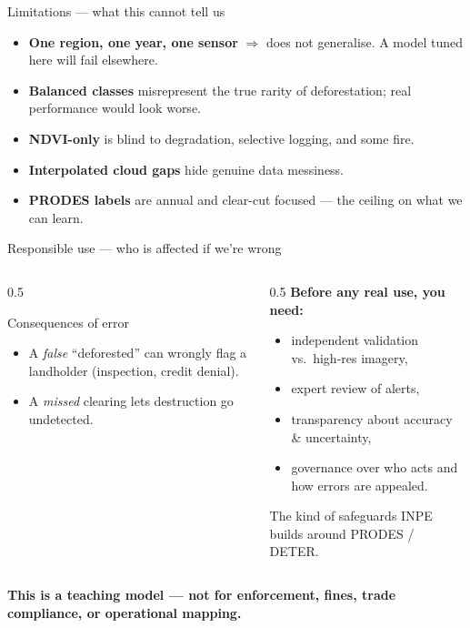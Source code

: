\documentclass[aspectratio=169,11pt]{beamer}
\newcommand{\src}[1]{{\scriptsize\color{inkgrey}#1}}
\begin{document}
\begin{frame}{Limitations — what this cannot tell us}
  \begin{itemize}
    \item \textbf{One region, one year, one sensor} $\Rightarrow$ does
          \alert{not generalise}. A model tuned here will fail elsewhere.
    \item \textbf{Balanced classes} misrepresent the true rarity of
          deforestation; real performance would look worse.
    \item \textbf{NDVI-only} is blind to degradation, selective logging, and
          some fire.
    \item \textbf{Interpolated cloud gaps} hide genuine data messiness.
    \item \textbf{PRODES labels} are annual and clear-cut focused — the ceiling
          on what we can learn.
  \end{itemize}
\end{frame}

\begin{frame}{Responsible use — who is affected if we're wrong}
  \begin{columns}[T]
    \begin{column}{0.5\textwidth}
      \begin{alertblock}{Consequences of error}
        \begin{itemize}\small
          \item A \emph{false} ``deforested'' can wrongly flag a landholder
                (inspection, credit denial).
          \item A \emph{missed} clearing lets destruction go undetected.
        \end{itemize}
      \end{alertblock}
    \end{column}
    \begin{column}{0.5\textwidth}
      \textbf{Before any real use, you need:}
      \begin{itemize}\small
        \item independent validation vs.\ high-res imagery,
        \item expert review of alerts,
        \item transparency about accuracy \& uncertainty,
        \item governance over who acts and how errors are appealed.
      \end{itemize}
      \src{The kind of safeguards INPE builds around PRODES / DETER.}
    \end{column}
  \end{columns}
  \vspace{0.3em}
  \centering
  \textbf{This is a teaching model — \alert{not} for enforcement, fines, trade
  compliance, or operational mapping.}
\end{frame}
\end{document}
